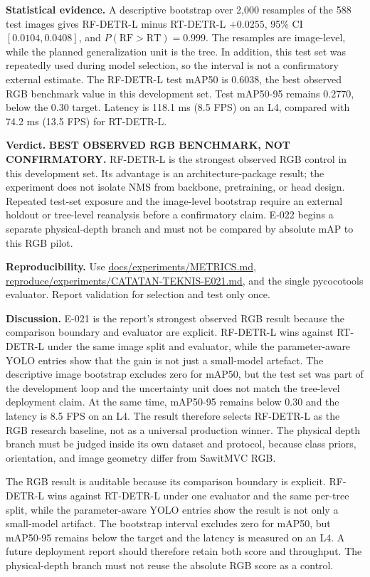 \documentclass[preprint,12pt]{elsarticle}
\newcommand{\pathcode}[1]{\scriptsize\url{#1}}
\begin{document}
\textbf{Statistical evidence.} A descriptive bootstrap over 2,000 resamples of
the 588 test images gives RF-DETR-L minus RT-DETR-L \(+0.0255\), 95\% CI
\([0.0104,0.0408]\), and \(P(\mathrm{RF}>\mathrm{RT})=0.999\). The resamples
are image-level, while the planned generalization unit is the tree. In
addition, this test set was repeatedly used during model selection, so the
interval is not a confirmatory external estimate. The RF-DETR-L test mAP50 is
\(0.6038\), the best observed RGB benchmark value in this development set.
Test mAP50-95 remains \(0.2770\), below the \(0.30\) target. Latency is
118.1 ms (8.5 FPS) on an L4, compared with 74.2 ms (13.5 FPS) for RT-DETR-L.

\textbf{Verdict.} \textbf{BEST OBSERVED RGB BENCHMARK, NOT CONFIRMATORY.}
RF-DETR-L is the strongest observed RGB control in this development set. Its
advantage is an architecture-package result; the experiment does not isolate
NMS from backbone, pretraining, or head design. Repeated test-set exposure and
the image-level bootstrap require an external holdout or tree-level
reanalysis before a confirmatory claim. E-022 begins a separate physical-depth
branch and must not be compared by absolute mAP to this RGB pilot.

\textbf{Reproducibility.} Use \pathcode{docs/experiments/METRICS.md},
\pathcode{reproduce/experiments/CATATAN-TEKNIS-E021.md}, and the single
pycocotools evaluator. Report validation for selection and test only once.

\textbf{Discussion.} E-021 is the report's strongest observed RGB result
because the comparison boundary and evaluator are explicit. RF-DETR-L wins
against RT-DETR-L under the same image split and evaluator, while the
parameter-aware YOLO entries show that the gain is not just a small-model
artefact. The descriptive image bootstrap excludes zero for mAP50, but the
test set was part of the development loop and the uncertainty unit does not
match the tree-level deployment claim. At the same time, mAP50-95 remains
below 0.30 and the latency is 8.5 FPS on an L4. The result therefore selects
RF-DETR-L as the RGB research baseline, not as a universal production winner.
The physical
depth branch must be judged inside its own dataset and protocol, because
class priors, orientation, and image geometry differ from SawitMVC RGB.

The RGB result is auditable because its comparison boundary is explicit.
RF-DETR-L wins against RT-DETR-L under one evaluator and the same per-tree
split, while the parameter-aware YOLO entries show the result is not only a
small-model artifact. The bootstrap interval excludes zero for mAP50, but
mAP50-95 remains below the target and the latency is measured on an L4. A
future deployment report should therefore retain both score and throughput.
The physical-depth branch must not reuse the absolute RGB score as a control.
\end{document}
